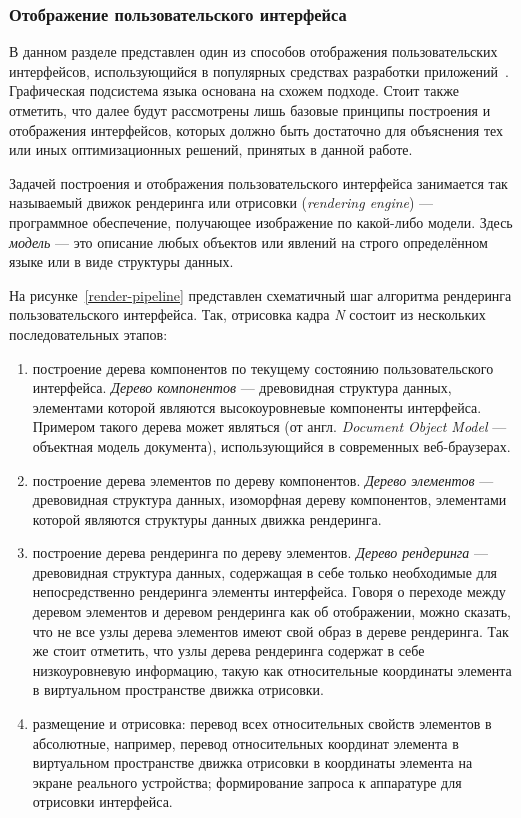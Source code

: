 \newpage
\subsubsection{Отображение пользовательского интерфейса}
\label{section:render-pipeline}
В данном разделе представлен один из способов
отображения пользовательских интерфейсов, использующийся в популярных
средствах разработки приложений~\cite{flutter-homepage,swift-homepage,
vuenative-homepage,reactnative-homepage}. Графическая подсистема
языка  основана на схожем подходе. Стоит также отметить, что
далее будут рассмотрены лишь базовые принципы построения и отображения
интерфейсов, которых должно быть достаточно для объяснения тех или иных
оптимизационных решений, принятых в данной работе.

Задачей построения и отображения пользовательского интерфейса занимается
так называемый движок рендеринга или отрисовки (\textit{ren\-dering engine})
--- программное обеспечение, получающее изображение по какой-либо модели.
Здесь \textit{модель} --- это описание любых объектов или явлений на строго
определённом языке или в виде структуры данных.

На рисунке~\ref{render-pipeline} представлен схематичный шаг алгоритма
рендеринга пользовательского интерфейса. Так, отрисовка кадра \textit{N}
состоит из нескольких последовательных этапов:
\begin{enumerate}
	\item построение дерева компонентов по текущему состоянию
	пользовательского интерфейса. \textit{Дерево компонентов} ---
	древовидная структура данных, элементами которой являются
	высокоуровневые компоненты интерфейса. Примером такого дерева
	может являться  (от англ. \textit{Document Object Model} ---
	объектная модель документа), использующийся в современных веб-браузерах.
	\item построение дерева элементов по дереву компонентов. \textit{Дерево
	элементов} --- древовидная структура данных, изоморфная дереву
	компонентов, элементами которой являются структуры данных движка
	рендеринга.
	\item построение дерева рендеринга по дереву элементов. \textit{Дерево
	рендеринга} --- древовидная структура данных, содержащая в себе только
	необходимые для непосредственно рендеринга элементы интерфейса. Говоря
	о переходе между деревом элементов и деревом рендеринга как об
	отображении, можно сказать, что не все узлы дерева элементов имеют
	свой образ в дереве рендеринга. Так же стоит отметить, что узлы дерева
	рендеринга содержат в себе низкоуровневую информацию, такую как
	относительные координаты элемента в виртуальном пространстве движка
	отрисовки.
	\item размещение и отрисовка: перевод всех относительных свойств
	элементов в абсолютные, например, перевод относительных координат
	элемента в виртуальном пространстве движка отрисовки в координаты
	элемента на экране реального устройства; формирование запроса к
	аппаратуре для отрисовки интерфейса.
\end{enumerate}

